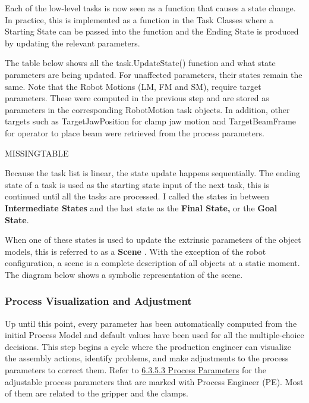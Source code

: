 Each of the low-level tasks is now seen as a function that causes a state change. In practice, this is implemented as a function in the Task Classes where a Starting State can be passed into the function and the Ending State is produced by updating the relevant parameters.



The table below shows all the task.UpdateState() function and what state parameters are being updated. For unaffected parameters, their states remain the same. Note that the Robot Motions (LM, FM and SM), require target parameters. These were computed in the previous step and are stored as parameters in the corresponding RobotMotion task objects. In addition, other targets such as TargetJawPosition for clamp jaw motion and TargetBeamFrame for operator to place beam were retrieved from the process parameters.

MISSINGTABLE

Because the task list is linear, the state update happens sequentially. The ending state of a task is used as the starting state input of the next task, this is continued until all the tasks are processed. I called the states in between \textbf{Intermediate States }and the last state as the \textbf{Final State, }or the \textbf{Goal State}.



When one of these states is used to update the extrinsic parameters of the object models, this is referred to as a \textbf{Scene} \parencite{moveit!PlanningSceneROS2023}. With the exception of the robot configuration, a scene is a complete description of all objects at a static moment. The diagram below shows a symbolic representation of the scene.




\subsubsection{Process Visualization and Adjustment}




Up until this point, every parameter has been automatically computed from the initial Process Model and default values have been used for all the multiple-choice decisions. This step begins a cycle where the production engineer can visualize the assembly actions, identify problems, and make adjustments to the process parameters to correct them. Refer to \ul{6.3.5.3 Process Parameters} for the adjustable process parameters that are marked with Process Engineer (PE). Most of them are related to the gripper and the clamps. 

